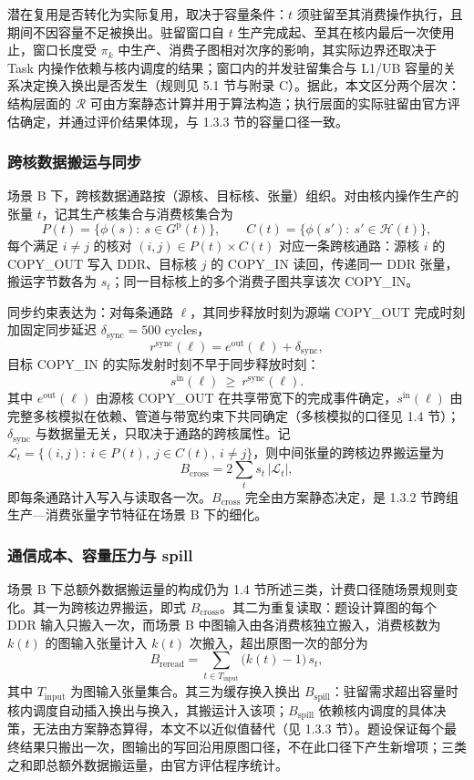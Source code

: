 潜在复用是否转化为实际复用，取决于容量条件：$t$ 须驻留至其消费操作执行，且期间不因容量不足被换出。驻留窗口自 $t$ 生产完成起、至其在核内最后一次使用止，窗口长度受 $\pi_k$ 中生产、消费子图相对次序的影响，其实际边界还取决于 Task 内操作依赖与核内调度的结果；窗口内的并发驻留集合与 L1/UB 容量的关系决定换入换出是否发生（规则见 5.1 节与附录 C）。据此，本文区分两个层次：结构层面的 $\mathcal{R}$ 可由方案静态计算并用于算法构造；执行层面的实际驻留由官方评估确定，并通过评价结果体现，与 1.3.3 节的容量口径一致。

\subsubsection{跨核数据搬运与同步}
场景 B 下，跨核数据通路按（源核、目标核、张量）组织。对由核内操作生产的张量 $t$，记其生产核集合与消费核集合为
\[ P(t)=\{\phi(s):\ s\in G^{\mathrm{p}}(t)\},\qquad C(t)=\{\phi(s'):\ s'\in\mathcal{H}(t)\}, \]
每个满足 $i\neq j$ 的核对 $(i,j)\in P(t)\times C(t)$ 对应一条跨核通路：源核 $i$ 的 COPY\_OUT 写入 DDR、目标核 $j$ 的 COPY\_IN 读回，传递同一 DDR 张量，搬运字节数各为 $s_t$；同一目标核上的多个消费子图共享该次 COPY\_IN。

同步约束表达为：对每条通路 $\ell$，其同步释放时刻为源端 COPY\_OUT 完成时刻加固定同步延迟 $\delta_{\mathrm{sync}}=500$ cycles，
\[ r^{\mathrm{sync}}(\ell)=e^{\mathrm{out}}(\ell)+\delta_{\mathrm{sync}}, \]
目标 COPY\_IN 的实际发射时刻不早于同步释放时刻：
\[ s^{\mathrm{in}}(\ell)\ \ge\ r^{\mathrm{sync}}(\ell). \]
其中 $e^{\mathrm{out}}(\ell)$ 由源核 COPY\_OUT 在共享带宽下的完成事件确定，$s^{\mathrm{in}}(\ell)$ 由完整多核模拟在依赖、管道与带宽约束下共同确定（多核模拟的口径见 1.4 节）；$\delta_{\mathrm{sync}}$ 与数据量无关，只取决于通路的跨核属性。记 $\mathcal{L}_t=\{(i,j):\ i\in P(t),\ j\in C(t),\ i\neq j\}$，则中间张量的跨核边界搬运量为
\[ B_{\mathrm{cross}}=2\sum_{t} s_t\,\bigl|\mathcal{L}_t\bigr|, \]
即每条通路计入写入与读取各一次。$B_{\mathrm{cross}}$ 完全由方案静态决定，是 1.3.2 节跨组生产—消费张量字节特征在场景 B 下的细化。

\subsubsection{通信成本、容量压力与 spill}
场景 B 下总额外数据搬运量的构成仍为 1.4 节所述三类，计费口径随场景规则变化。其一为跨核边界搬运，即式 $B_{\mathrm{cross}}$。其二为重复读取：题设计算图的每个 DDR 输入只搬入一次，而场景 B 中图输入由各消费核独立搬入，消费核数为 $k(t)$ 的图输入张量计入 $k(t)$ 次搬入，超出原图一次的部分为
\[ B_{\mathrm{reread}}=\sum_{t\in T_{\mathrm{input}}} \bigl(k(t)-1\bigr)\,s_t, \]
其中 $T_{\mathrm{input}}$ 为图输入张量集合。其三为缓存换入换出 $B_{\mathrm{spill}}$：驻留需求超出容量时核内调度自动插入换出与换入，其搬运计入该项；$B_{\mathrm{spill}}$ 依赖核内调度的具体决策，无法由方案静态算得，本文不以近似值替代（见 1.3.3 节）。题设保证每个最终结果只搬出一次，图输出的写回沿用原图口径，不在此口径下产生新增项；三类之和即总额外数据搬运量，由官方评估程序统计。

